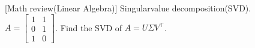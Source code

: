 \item {} [Math review(Linear Algebra)] Singularvalue decomposition(SVD). \\
$A=\left[\begin{array}{ll}1 & 1 \\ 0 & 1 \\ 1 & 0\end{array}\right]$. Find the SVD of $A=U \Sigma V^{\top}$.

\solution




\newpage